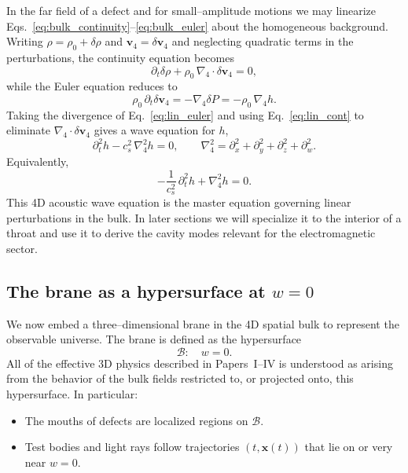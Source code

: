 \documentclass[12pt]{article}
\begin{document}
In the far field of a defect and for small--amplitude motions we may linearize
Eqs.~\eqref{eq:bulk_continuity}--\eqref{eq:bulk_euler} about the homogeneous
background.  Writing $\rho = \rho_0 + \delta\rho$ and
$\mathbf{v}_4 = \delta\mathbf{v}_4$ and neglecting quadratic terms in the
perturbations, the continuity equation becomes
\begin{equation}
  \partial_t \delta\rho
  + \rho_0\,\nabla_4\cdot\delta\mathbf{v}_4
  = 0,
  \label{eq:lin_cont}
\end{equation}
while the Euler equation reduces to
\begin{equation}
  \rho_0\,\partial_t \delta\mathbf{v}_4
  = - \nabla_4 \delta P
  = - \rho_0\,\nabla_4 h.
  \label{eq:lin_euler}
\end{equation}
Taking the divergence of Eq.~\eqref{eq:lin_euler} and using
Eq.~\eqref{eq:lin_cont} to eliminate $\nabla_4\cdot\delta\mathbf{v}_4$ gives
a wave equation for $h$,
\begin{equation}
  \partial_t^2 h
  - c_s^2\,\nabla_4^2 h
  = 0,
  \qquad
  \nabla_4^2
  = \partial_x^2 + \partial_y^2 + \partial_z^2 + \partial_w^2.
  \label{eq:4d_acoustic}
\end{equation}
Equivalently,
\begin{equation}
  -\frac{1}{c_s^2}\,\partial_t^2 h
  + \nabla_4^2 h
  = 0.
\end{equation}
This 4D acoustic wave equation is the master equation governing linear
perturbations in the bulk.  In later sections we will specialize it to the
interior of a throat and use it to derive the cavity modes relevant for the
electromagnetic sector.

\subsection{The brane as a hypersurface at \texorpdfstring{$w=0$}{w = 0}}
\label{subsec:brane_hypersurface}

We now embed a three--dimensional brane in the 4D spatial bulk to represent
the observable universe.  The brane is defined as the hypersurface
\begin{equation}
  \mathcal{B}:\quad w = 0.
\end{equation}
All of the effective 3D physics described in Papers~I--IV is understood as
arising from the behavior of the bulk fields restricted to, or projected
onto, this hypersurface.  In particular:
\begin{itemize}
  \item The mouths of defects are localized regions on $\mathcal{B}$.
  \item Test bodies and light rays follow trajectories $(t,\mathbf{x}(t))$
    that lie on or very near $w=0$.
\end{itemize}
\end{document}
